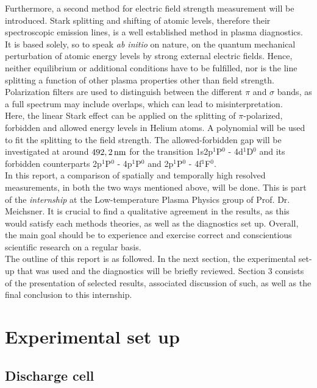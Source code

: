 \documentclass[a4paper,10pt,twoside]{article}
\newcommand{\tilt}[1]{\textit{#1}}
\newcommand{\groupname}{Low-temperature Plasma Physics group} %
\begin{document}
		Furthermore, a second method for electric field \linebreak strength measurement will be introduced. Stark splitting and shifting of atomic levels, therefore their spectroscopic emission lines, is a well established method in plasma diagnostics. It is based solely, so to speak \tilt{ab initio} on nature, on the quantum mechanical perturbation of atomic energy levels by strong external electric fields. Hence, neither equilibrium or additional conditions have to be fulfilled, nor is the line splitting a function of other plasma properties other than field strength. Polarization filters are used to distinguish between the different $\pi$ and $\sigma$ bands, as a full spectrum may include overlaps, which can lead to misinterpretation.\\
		Here, the linear Stark effect can be applied on the splitting of $\pi$-polarized, forbidden and allowed energy levels in Helium atoms. A polynomial will be used to fit the splitting to the field strength. The allowed-forbidden gap will be investigated at around $\unit[492,2]{nm}$ for the transition 1s2p$^1$P$^0$ - 4d$^1$D$^0$ and its forbidden counterparts 2p$^1$P$^0$ - 4p$^1$P$^0$ and 2p$^1$P$^0$ - 4f$^1$F$^0$.\\
		In this report, a comparison of spatially and temporally high resolved measurements, in both the two ways mentioned above, will be done. This is part of the \tilt{internship} at the \groupname\,\,of Prof. Dr. Meichsner. It is crucial to find a qualitative agreement in the results, as this would satisfy each methods theories, as well as the diagnostics set up. Overall, the main goal should be to experience and exercise correct and conscientious scientific research on a regular basis.\\
		The outline of this report is as followed. In the next section, the experimental set-up that was used and the diagnostics will be briefly reviewed. Section 3 consists of the presentation of selected results, associated discussion of such, as well as the final conclusion to this internship.

	\section{Experimental set up}
	
		\subsection{Discharge cell}
		
\end{document}

